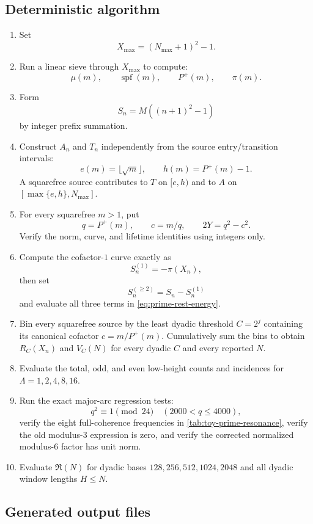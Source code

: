 \documentclass[11pt]{article}
\theoremstyle{definition}
\theoremstyle{remark}
\newcommand{\Pplus}{P^{+}}
\newcommand{\1}{\mathbf{1}}
\begin{document}
\subsection{Deterministic algorithm}

\begin{enumerate}[leftmargin=1.7em,itemsep=0.3em]
\item Set
\[
 X_{\max}=(N_{\max}+1)^2-1.
\]
\item Run a linear sieve through $X_{\max}$ to compute:
\[
 \mu(m),\qquad
 \operatorname{spf}(m),\qquad
 \Pplus(m),\qquad
 \pi(m).
\]
\item Form
\[
 S_n=M((n+1)^2-1)
\]
by integer prefix summation.
\item Construct $A_n$ and $T_n$ independently from the source
entry/transition intervals:
\[
 e(m)=\lfloor\sqrt m\rfloor,
 \qquad
 h(m)=\Pplus(m)-1.
\]
A squarefree source contributes to $T$ on $[e,h)$ and to $A$ on
$[\max\{e,h\},N_{\max}]$.
\item For every squarefree $m>1$, put
\[
 q=\Pplus(m),
 \qquad
 c=m/q,
 \qquad
 2Y=q^2-c^2.
\]
Verify the norm, curve, and lifetime identities using integers only.
\item Compute the cofactor-$1$ curve exactly as
\[
 S_n^{(1)}=-\pi(X_n),
\]
then set
\[
 S_n^{(\ge2)}=S_n-S_n^{(1)}
\]
and evaluate all three terms in
\cref{eq:prime-rest-energy}.
\item Bin every squarefree source by the least dyadic threshold
$C=2^j$ containing its canonical cofactor $c=m/\Pplus(m)$.  Cumulatively
sum the bins to obtain $R_C(X_n)$ and $V_C(N)$ for every dyadic $C$ and
every reported $N$.
\item Evaluate the total, odd, and even low-height counts and incidences
for $\Lambda=1,2,4,8,16$.
\item Run the exact major-arc regression tests:
\[
 q^2\equiv1\pmod{24}\quad(2000<q\le4000),
\]
verify the eight full-coherence frequencies in
\cref{tab:toy-prime-resonance}, verify the old modulus-$3$ expression is zero,
and verify the corrected normalized modulus-$6$ factor has unit norm.
\item Evaluate $\mathfrak R(N)$ for dyadic bases
$128,256,512,1024,2048$ and all dyadic window lengths $H\le N$.
\end{enumerate}

\subsection{Generated output files}
\end{document}
